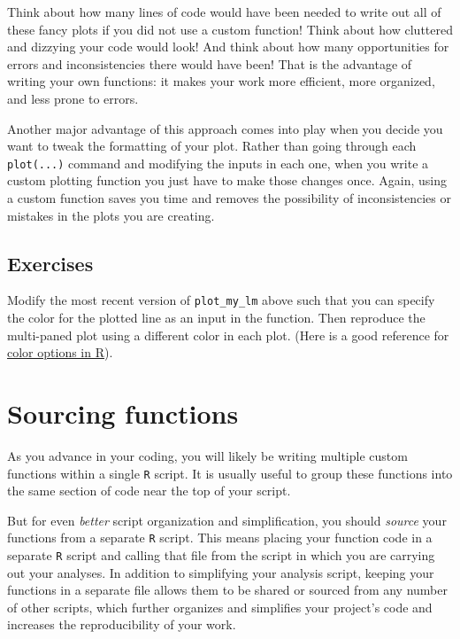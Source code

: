 \documentclass[]{book}
\begin{document}
Think about how many lines of code would have been needed to write out all of these fancy plots if you did not use a custom function! Think about how cluttered and dizzying your code would look! And think about how many opportunities for errors and inconsistencies there would have been! That is the advantage of writing your own functions: it makes your work more efficient, more organized, and less prone to errors.

Another major advantage of this approach comes into play when you decide you want to tweak the formatting of your plot. Rather than going through each \texttt{plot(...)} command and modifying the inputs in each one, when you write a custom plotting function you just have to make those changes once. Again, using a custom function saves you time and removes the possibility of inconsistencies or mistakes in the plots you are creating.

\hypertarget{exercises-18}{%
\subsection*{Exercises}\label{exercises-18}}

Modify the most recent version of \texttt{plot\_my\_lm} above such that you can specify the color for the plotted line as an input in the function. Then reproduce the multi-paned plot using a different color in each plot. (Here is a good reference for \href{http://www.stat.columbia.edu/~tzheng/files/Rcolor.pdf}{color options in R}).

\hypertarget{sourcing-functions}{%
\section*{Sourcing functions}\label{sourcing-functions}}

As you advance in your coding, you will likely be writing multiple custom functions within a single \texttt{R} script. It is usually useful to group these functions into the same section of code near the top of your script.

But for even \emph{better} script organization and simplification, you should \emph{source} your functions from a separate \texttt{R} script. This means placing your function code in a separate \texttt{R} script and calling that file from the script in which you are carrying out your analyses. In addition to simplifying your analysis script, keeping your functions in a separate file allows them to be shared or sourced from any number of other scripts, which further organizes and simplifies your project's code and increases the reproducibility of your work.
\end{document}
